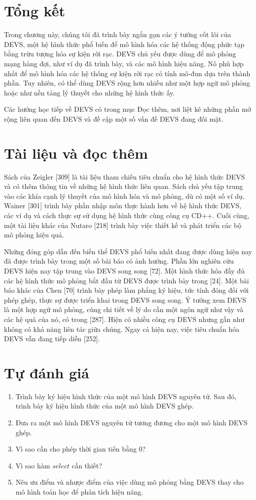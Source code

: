 \section{Tổng kết}
Trong chương này, chúng tôi đã trình bày ngắn gọn các ý tưởng cốt lõi của DEVS, một hệ hình thức phổ biến để mô hình hóa các hệ thống động phức tạp bằng trừu tượng hóa sự kiện rời rạc. DEVS chủ yếu được dùng để mô phỏng mạng hàng đợi, như ví dụ đã trình bày, và các mô hình hiệu năng. Nó phù hợp nhất để mô hình hóa các hệ thống sự kiện rời rạc có tính mô-đun dựa trên thành phần. Tuy nhiên, có thể dùng DEVS rộng hơn nhiều như một hợp ngữ mô phỏng hoặc như nền tảng lý thuyết cho những hệ hình thức ấy.

Các hướng học tiếp về DEVS có trong mục Đọc thêm, nơi liệt kê những phần mở rộng liên quan đến DEVS và đề cập một số vấn đề DEVS đang đối mặt.

\section{Tài liệu và đọc thêm}
Sách của Zeigler [309] là tài liệu tham chiếu tiêu chuẩn cho hệ hình thức DEVS và có thêm thông tin về những hệ hình thức liên quan. Sách chủ yếu tập trung vào các khía cạnh lý thuyết của mô hình hóa và mô phỏng, dù có một số ví dụ. Wainer [301] trình bày phần nhập môn thực hành hơn về hệ hình thức DEVS, các ví dụ và cách thực sự sử dụng hệ hình thức cùng công cụ CD++. Cuối cùng, một tài liệu khác của Nutaro [218] trình bày việc thiết kế và phát triển các bộ mô phỏng hiệu quả.

Những đóng góp dẫn đến biến thể DEVS phổ biến nhất đang được dùng hiện nay đã được trình bày trong một số bài báo có ảnh hưởng. Phần lớn nghiên cứu DEVS hiện nay tập trung vào DEVS song song [72]. Một hình thức hóa đầy đủ các hệ hình thức mô phỏng bắt đầu từ DEVS được trình bày trong [24]. Một bài báo khác của Chen [70] trình bày phép làm phẳng ký hiệu, tức tính đóng đối với phép ghép, thực sự được triển khai trong DEVS song song. Ý tưởng xem DEVS là một hợp ngữ mô phỏng, cùng chi tiết về lý do cần một ngôn ngữ như vậy và các hệ quả của nó, có trong [287]. Hiện có nhiều công cụ DEVS nhưng gần như không có khả năng liên tác giữa chúng. Ngay cả hiện nay, việc tiêu chuẩn hóa DEVS vẫn đang tiếp diễn [252].

\section{Tự đánh giá}
\begin{enumerate}
\item Trình bày ký hiệu hình thức của một mô hình DEVS nguyên tử. Sau đó, trình bày ký hiệu hình thức của một mô hình DEVS ghép.
\item Đưa ra một mô hình DEVS nguyên tử tương đương cho một mô hình DEVS ghép.
\item Vì sao cần cho phép thời gian tiến bằng 0?
\item Vì sao hàm $select$ cần thiết?
\item Nêu ưu điểm và nhược điểm của việc dùng mô phỏng bằng DEVS thay cho mô hình toán học để phân tích hiệu năng.
\end{enumerate}


